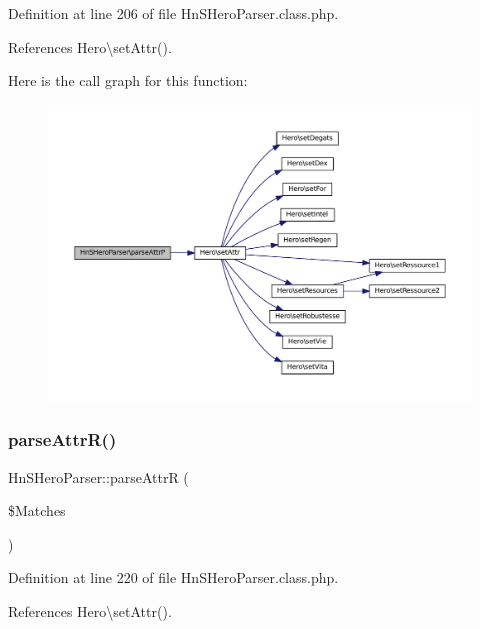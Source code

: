 Definition at line 206 of file Hn\+S\+Hero\+Parser.\+class.\+php.



References Hero\textbackslash{}set\+Attr().

Here is the call graph for this function\+:\nopagebreak
\begin{figure}[H]
\begin{center}
\leavevmode
\includegraphics[width=350pt]{class_hn_s_hero_parser_a9e86a51dd6f1b0d2f60a92a840e3deb4_cgraph}
\end{center}
\end{figure}
\mbox{\label{class_hn_s_hero_parser_adcc83933771af3b55b0fa5c6d08e3dba}} 
\subsubsection{\texorpdfstring{parse\+Attr\+R()}{parseAttrR()}}
{\footnotesize\ttfamily Hn\+S\+Hero\+Parser\+::parse\+AttrR (\begin{DoxyParamCaption}\item[{}]{\$\+Matches }\end{DoxyParamCaption})\hspace{0.3cm}{\ttfamily [protected]}}



Definition at line 220 of file Hn\+S\+Hero\+Parser.\+class.\+php.



References Hero\textbackslash{}set\+Attr().

